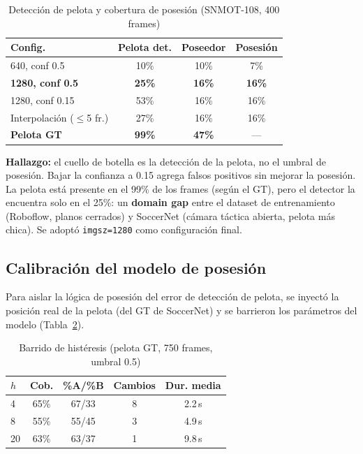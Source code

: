 \documentclass[conference]{IEEEtran}
\begin{document}
\begin{table}[htbp]
\caption{Detección de pelota y cobertura de posesión (SNMOT-108, 400 frames)}
\begin{center}
\begin{tabular}{lccc}
\toprule
\textbf{Config.} & \textbf{Pelota det.} & \textbf{Poseedor} & \textbf{Posesión} \\
\midrule
640, conf 0.5 & 10\% & 10\% & 7\% \\
\textbf{1280, conf 0.5} & \textbf{25\%} & \textbf{16\%} & \textbf{16\%} \\
1280, conf 0.15 & 53\% & 16\% & 16\% \\
Interpolación ($\leq$5 fr.) & 27\% & 16\% & 16\% \\
\textbf{Pelota GT} & \textbf{99\%} & \textbf{47\%} & --- \\
\bottomrule
\end{tabular}
\label{tab:ball_detection}
\end{center}
\end{table}

\textbf{Hallazgo:} el cuello de botella es la detección de la pelota, no el
umbral de posesión. Bajar la confianza a 0.15 agrega falsos positivos sin
mejorar la posesión. La pelota está presente en el 99\% de los frames
(según el GT), pero el detector la encuentra solo en el 25\%: un
\textbf{domain gap} entre el dataset de entrenamiento (Roboflow, planos
cerrados) y SoccerNet (cámara táctica abierta, pelota más chica). Se
adoptó \texttt{imgsz=1280} como configuración final.

\subsection{Calibración del modelo de posesión}

Para aislar la lógica de posesión del error de detección de pelota, se
inyectó la posición real de la pelota (del GT de SoccerNet) y se barrieron
los parámetros del modelo (Tabla~\ref{tab:hysteresis}).

\begin{table}[htbp]
\caption{Barrido de histéresis (pelota GT, 750 frames, umbral 0.5)}
\begin{center}
\begin{tabular}{lcccc}
\toprule
\textbf{$h$} & \textbf{Cob.} & \textbf{\%A/\%B} & \textbf{Cambios} & \textbf{Dur. media} \\
\midrule
4 & 65\% & 67/33 & 8 & 2.2\,s \\
8 & 55\% & 55/45 & 3 & 4.9\,s \\
20 & 63\% & 63/37 & 1 & 9.8\,s \\
\bottomrule
\end{tabular}
\label{tab:hysteresis}
\end{center}
\end{table}
\end{document}
